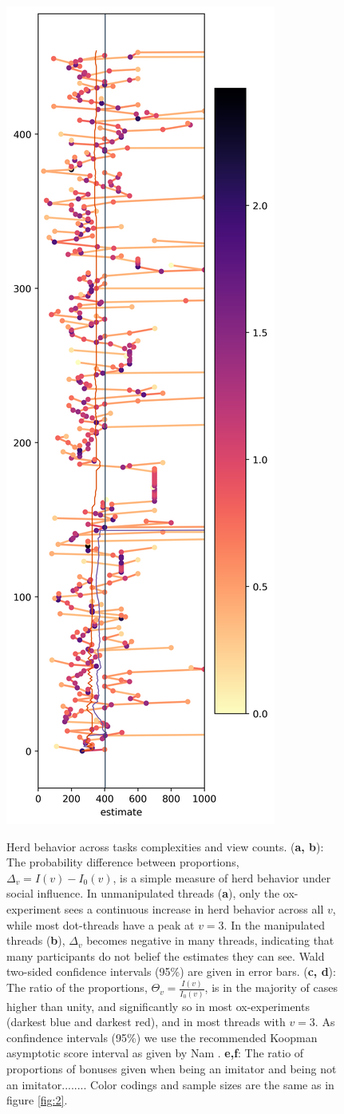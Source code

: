 \documentclass[10pt,a4paper,twocolumn,lineno]{article}
\begin{document}
\begin{figure}
\caption[Herd behavior across tasks complexities and view counts.]{\small
Herd behavior across tasks complexities and view counts. (\textbf{a, b}): The probability difference between proportions, $\Delta_v = I(v) - I_0(v)$, is a simple measure of herd behavior under social influence. In unmanipulated threads (\textbf{a}), only the ox-experiment sees a continuous increase in herd behavior across all $v$, while most dot-threads have a peak at $v=3$. In the manipulated threads (\textbf{b}), $\Delta_v$ becomes negative in many threads, indicating that many participants do not belief the estimates they can see. Wald two-sided confidence intervals (95\%) are given in error bars. (\textbf{c, d}): The ratio of the proportions, $\Theta_v = \frac{I(v)}{I_0(v)}$, is in the majority of cases higher than unity, and significantly so in most ox-experiments (darkest blue and darkest red), and in most threads with $v=3$. As confindence intervals (95\%) we use the recommended \cite{fagerland2015recommended} Koopman asymptotic score interval as given by Nam \cite{nam1995confidence}. \textbf{e,f}:  The ratio of proportions of bonuses given when being an imitator and being not an imitator........ Color codings and sample sizes are the same as in figure \ref{fig:2}.
}
\includegraphics[width=.45\textwidth]{../plots/fig3.png}
\label{fig:3}
\end{figure}
\end{document}
